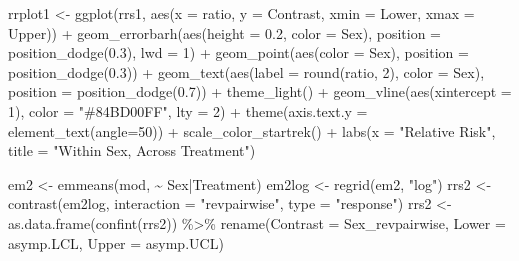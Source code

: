 \documentclass[12pt]{article}
\newenvironment{Shaded}{\begin{snugshade}}{\end{snugshade}}
\newcommand{\AttributeTok}[1]{\textcolor[rgb]{0.77,0.63,0.00}{#1}}
\newcommand{\DecValTok}[1]{\textcolor[rgb]{0.00,0.00,0.81}{#1}}
\newcommand{\FloatTok}[1]{\textcolor[rgb]{0.00,0.00,0.81}{#1}}
\newcommand{\FunctionTok}[1]{\textcolor[rgb]{0.00,0.00,0.00}{#1}}
\newcommand{\NormalTok}[1]{#1}
\newcommand{\OtherTok}[1]{\textcolor[rgb]{0.56,0.35,0.01}{#1}}
\newcommand{\SpecialCharTok}[1]{\textcolor[rgb]{0.00,0.00,0.00}{#1}}
\newcommand{\StringTok}[1]{\textcolor[rgb]{0.31,0.60,0.02}{#1}}
\begin{document}
\begin{Shaded}
\begin{Highlighting}[]
\NormalTok{rrplot1 }\OtherTok{\textless{}{-}} \FunctionTok{ggplot}\NormalTok{(rrs1, }\FunctionTok{aes}\NormalTok{(}\AttributeTok{x =}\NormalTok{ ratio, }\AttributeTok{y =}\NormalTok{ Contrast, }\AttributeTok{xmin =}\NormalTok{ Lower, }\AttributeTok{xmax =}\NormalTok{ Upper)) }\SpecialCharTok{+}
  \FunctionTok{geom\_errorbarh}\NormalTok{(}\FunctionTok{aes}\NormalTok{(}\AttributeTok{height =} \FloatTok{0.2}\NormalTok{, }\AttributeTok{color =}\NormalTok{ Sex),}
                 \AttributeTok{position =} \FunctionTok{position\_dodge}\NormalTok{(}\FloatTok{0.3}\NormalTok{), }\AttributeTok{lwd =} \DecValTok{1}\NormalTok{) }\SpecialCharTok{+}
  \FunctionTok{geom\_point}\NormalTok{(}\FunctionTok{aes}\NormalTok{(}\AttributeTok{color =}\NormalTok{ Sex), }\AttributeTok{position =} \FunctionTok{position\_dodge}\NormalTok{(}\FloatTok{0.3}\NormalTok{)) }\SpecialCharTok{+}
  \FunctionTok{geom\_text}\NormalTok{(}\FunctionTok{aes}\NormalTok{(}\AttributeTok{label =} \FunctionTok{round}\NormalTok{(ratio, }\DecValTok{2}\NormalTok{), }\AttributeTok{color =}\NormalTok{ Sex), }
            \AttributeTok{position =} \FunctionTok{position\_dodge}\NormalTok{(}\FloatTok{0.7}\NormalTok{)) }\SpecialCharTok{+}
  \FunctionTok{theme\_light}\NormalTok{() }\SpecialCharTok{+}
  \FunctionTok{geom\_vline}\NormalTok{(}\FunctionTok{aes}\NormalTok{(}\AttributeTok{xintercept =} \DecValTok{1}\NormalTok{), }\AttributeTok{color =} \StringTok{"\#84BD00FF"}\NormalTok{, }\AttributeTok{lty =} \DecValTok{2}\NormalTok{) }\SpecialCharTok{+}
  \FunctionTok{theme}\NormalTok{(}\AttributeTok{axis.text.y =} \FunctionTok{element\_text}\NormalTok{(}\AttributeTok{angle=}\DecValTok{50}\NormalTok{)) }\SpecialCharTok{+}
  \FunctionTok{scale\_color\_startrek}\NormalTok{() }\SpecialCharTok{+}
  \FunctionTok{labs}\NormalTok{(}\AttributeTok{x =} \StringTok{"Relative Risk"}\NormalTok{,}
       \AttributeTok{title =} \StringTok{"Within Sex, Across Treatment"}\NormalTok{)}

\NormalTok{em2 }\OtherTok{\textless{}{-}} \FunctionTok{emmeans}\NormalTok{(mod, }\SpecialCharTok{\textasciitilde{}}\NormalTok{ Sex}\SpecialCharTok{|}\NormalTok{Treatment)}
\NormalTok{em2log }\OtherTok{\textless{}{-}} \FunctionTok{regrid}\NormalTok{(em2, }\StringTok{"log"}\NormalTok{)}
\NormalTok{rrs2 }\OtherTok{\textless{}{-}} \FunctionTok{contrast}\NormalTok{(em2log, }\AttributeTok{interaction =} \StringTok{"revpairwise"}\NormalTok{, }\AttributeTok{type =} \StringTok{"response"}\NormalTok{)}
\NormalTok{rrs2 }\OtherTok{\textless{}{-}} \FunctionTok{as.data.frame}\NormalTok{(}\FunctionTok{confint}\NormalTok{(rrs2)) }\SpecialCharTok{\%\textgreater{}\%}
  \FunctionTok{rename}\NormalTok{(}\AttributeTok{Contrast =}\NormalTok{ Sex\_revpairwise, }\AttributeTok{Lower =}\NormalTok{ asymp.LCL, }\AttributeTok{Upper =}\NormalTok{ asymp.UCL)}


\end{Highlighting}
\end{Shaded}
\end{document}
